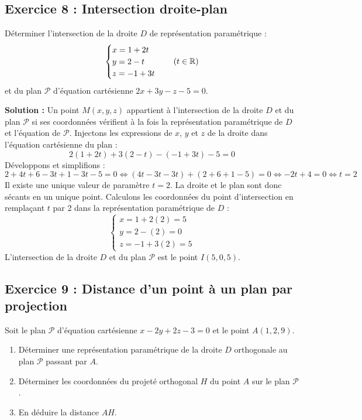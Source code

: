\subsection*{Exercice 8 : Intersection droite-plan}
Déterminer l'intersection de la droite $D$ de représentation paramétrique :
\[
\begin{cases}
x = 1 + 2t \\
y = 2 - t \\
z = -1 + 3t
\end{cases} \quad (t \in \mathbb{R})
\]
et du plan $\mathcal{P}$ d'équation cartésienne $2x + 3y - z - 5 = 0$.

\textbf{Solution :}
Un point $M(x, y, z)$ appartient à l'intersection de la droite $D$ et du plan $\mathcal{P}$ si ses coordonnées vérifient à la fois la représentation paramétrique de $D$ et l'équation de $\mathcal{P}$.
Injectons les expressions de $x$, $y$ et $z$ de la droite dans l'équation cartésienne du plan :
\[
2(1 + 2t) + 3(2 - t) - (-1 + 3t) - 5 = 0
\]
Développons et simplifions :
\[
2 + 4t + 6 - 3t + 1 - 3t - 5 = 0 \iff (4t - 3t - 3t) + (2 + 6 + 1 - 5) = 0 \iff -2t + 4 = 0 \iff t = 2
\]
Il existe une unique valeur de paramètre $t = 2$. La droite et le plan sont donc sécants en un unique point.
Calculons les coordonnées du point d'intersection en remplaçant $t$ par 2 dans la représentation paramétrique de $D$ :
\[
\begin{cases}
x = 1 + 2(2) = 5 \\
y = 2 - (2) = 0 \\
z = -1 + 3(2) = 5
\end{cases}
\]
L'intersection de la droite $D$ et du plan $\mathcal{P}$ est le point $I(5, 0, 5)$.

\subsection*{Exercice 9 : Distance d'un point à un plan par projection}
Soit le plan $\mathcal{P}$ d'équation cartésienne $x - 2y + 2z - 3 = 0$ et le point $A(1, 2, 9)$.
\begin{enumerate}
    \item Déterminer une représentation paramétrique de la droite $D$ orthogonale au plan $\mathcal{P}$ passant par $A$.
    \item Déterminer les coordonnées du projeté orthogonal $H$ du point $A$ sur le plan $\mathcal{P}$.
    \item En déduire la distance $AH$.
\end{enumerate}


